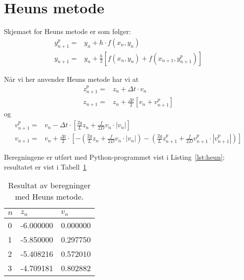 \section{Heuns metode} %
\label{sec:heuns_metode}
Skjemaet for Heuns metode er som følger:
\begin{align}
  y_{n+1}^p = & y_n + h \cdot f(x_n,y_n) \\
  y_{n+1}   = & y_n + \frac{h}{2} \left[f(x_n,y_n)+f(x_{n+1},y_{n+1}^p)\right]
\end{align}

Når vi her anvender Heuns metode har vi at
\begin{align}
  z_{n+1}^p = & z_n + \Delta t \cdot v_n \\
  z_{n+1}   = & z_n + \frac{\Delta t}{2} \left[ v_n + v_{n+1}^p \right]
\end{align}
og
\begin{align}
  v_{n+1}^p = & v_n - \Delta t \cdot \left[ \frac{2g}{L}z_n + \frac{f}{2D}v_n            \cdot |v_n| \right] \\
  v_{n+1} = & v_n + \frac{\Delta t}{2} \cdot
    \left[
      - \left( \frac{2g}{L}z_n + \frac{f}{2D}v_n \cdot |v_n| \right)
      - \left( \frac{2g}{L}z_{n+1}^p + \frac{f}{2D}v_{n+1}^p \cdot |v_{n+1}^p| \right)
    \right]
\end{align}

Beregningene er utført med Python-programmet vist i Listing~\ref{lst:heun}; resultatet er vist i Tabell~\ref{tab:heun}


\begin{table}[H]
  \centering
  \caption{Resultat av beregninger med Heuns metode.}
  \label{tab:heun}
  \begin{tabularx}{0.6\textwidth}{XXX}
    \toprule
    $n$  & $z_n$  & $v_n$ \\
    \midrule
    0 & -6.000000 & 0.000000 \\
    1 & -5.850000 & 0.297750 \\
    2 & -5.408216 & 0.572010 \\
    3 & -4.709181 & 0.802882 \\
    \bottomrule
  \end{tabularx}
\end{table}


